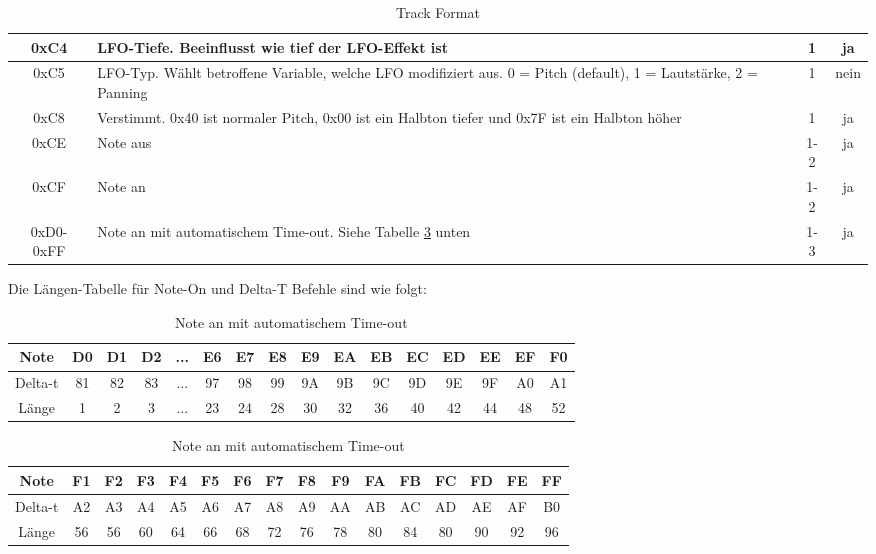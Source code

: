 \documentclass[11pt,a4paper]{scrartcl}
\begin{document}
\begin{table}[!h]
\begin{tabular}{ c | p{11cm}| c | c}
				\hline
        0xC4 & LFO-Tiefe. Beeinflusst wie tief der LFO-Effekt ist & 1 & ja\\
				\hline
        0xC5 & LFO-Typ. W\"{a}hlt betroffene Variable, welche LFO modifiziert aus. 0 = Pitch (default), 1 = Lautst\"{a}rke, 2 = Panning& 1 & nein\\
				\hline
        0xC8 & Verstimmt. 0x40 ist normaler Pitch, 0x00 ist ein Halbton tiefer und 0x7F ist ein Halbton h\"{o}her & 1 & ja\\
				\hline
        0xCE & Note aus & 1-2 & ja\\
				\hline
        0xCF & Note an & 1-2 & ja\\
				\hline
        0xD0-0xFF & Note an mit automatischem Time-out. Siehe Tabelle \ref{table:Timeout} unten & 1-3 & ja\\
    \end{tabular}
    \caption{Track Format}
    \label{table:TrackFormat}
\end{table}
\newpage

Die L\"{a}ngen-Tabelle f\"{u}r Note-On und Delta-T Befehle sind wie folgt:

\begin{table}[h]
    \centering
    \begin{tabular}{ c | c | c | c | c | c | c | c | c | c | c | c | c | c | c | c }
        \textbf{Note} & \textbf{D0} & \textbf{D1} & \textbf{D2} & \textbf{...} & \textbf{E6} & \textbf{E7} & \textbf{E8} & \textbf{E9} & \textbf{EA} & \textbf{EB} & \textbf{EC} & \textbf{ED} & \textbf{EE} & \textbf{EF} & \textbf{F0}\\
        \hline
        Delta-t & 81 & 82 & 83 & ... & 97 & 98 & 99 & 9A & 9B & 9C & 9D & 9E & 9F & A0 & A1\\
        \hline
        L\"{a}nge & 1 & 2 & 3 & ... & 23 & 24 & 28 & 30 & 32 & 36 & 40 & 42 & 44 & 48 & 52\\
    \end{tabular}
		\begin{tabular}{ c | c | c | c | c | c | c | c | c | c | c | c | c | c | c | c }
        \textbf{Note} & \textbf{F1} & \textbf{F2} & \textbf{F3} & \textbf{F4} & \textbf{F5} & \textbf{F6} & \textbf{F7} & \textbf{F8} & \textbf{F9} & \textbf{FA} & \textbf{FB} & \textbf{FC} & \textbf{FD} & \textbf{FE} & \textbf{FF}\\
        \hline
        Delta-t & A2 & A3 & A4 & A5 & A6 & A7 & A8 & A9 & AA & AB & AC & AD & AE & AF & B0\\
        \hline
        L\"{a}nge & 56 & 56 & 60 & 64 & 66 & 68 & 72 & 76 & 78 & 80 & 84 & 80 & 90 & 92 & 96\\
    \end{tabular}
    \caption{Note an mit automatischem Time-out}
    \label{table:Timeout}
\end{table}
\end{document}
